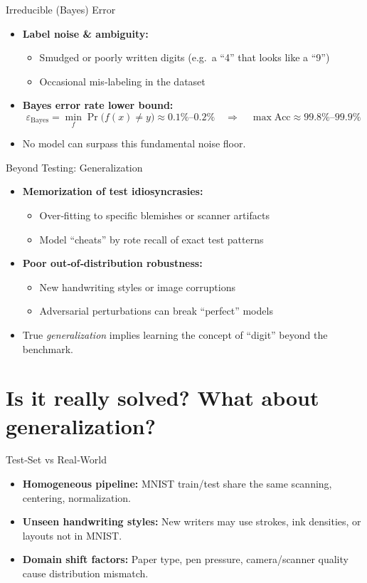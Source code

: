 \documentclass[german,10pt]{beamer}
\begin{document}
\begin{frame}{Irreducible (Bayes) Error}
  \begin{itemize}
    \item \textbf{Label noise \& ambiguity:}
      \begin{itemize}
        \item Smudged or poorly written digits (e.g.\ a “4” that looks like a “9”)
        \item Occasional mis‑labeling in the dataset
      \end{itemize}
    \item \textbf{Bayes error rate lower bound:}
      \[
        \varepsilon_{\mathrm{Bayes}}
        = \min_f \Pr\bigl(f(x)\neq y\bigr)
        \approx 0.1\% \text{–}0.2\%
        \quad\Longrightarrow\quad
        \max\text{Acc}\approx 99.8\%\text{–}99.9\%
      \]
    \item No model can surpass this fundamental noise floor.
  \end{itemize}
\end{frame}


\begin{frame}{Beyond Testing: Generalization}
  \begin{itemize}
    \item \textbf{Memorization of test idiosyncrasies:}
      \begin{itemize}
        \item Over‑fitting to specific blemishes or scanner artifacts
        \item Model “cheats” by rote recall of exact test patterns
      \end{itemize}
    \item \textbf{Poor out‑of‑distribution robustness:}
      \begin{itemize}
        \item New handwriting styles or image corruptions
        \item Adversarial perturbations can break “perfect” models
      \end{itemize}
    \item True \emph{generalization} implies learning the concept of “digit” beyond the benchmark.
  \end{itemize}
\end{frame}

\section{Is it really solved? What about generalization?}
\begin{frame}{Test‑Set vs Real‑World}
  \begin{itemize}
    \item \textbf{Homogeneous pipeline:}
      MNIST train/test share the same scanning, centering, normalization.
    \item \textbf{Unseen handwriting styles:}
      New writers may use strokes, ink densities, or layouts not in MNIST.
    \item \textbf{Domain shift factors:}
      Paper type, pen pressure, camera/scanner quality cause distribution mismatch.
  \end{itemize}
\end{frame}
\end{document}
